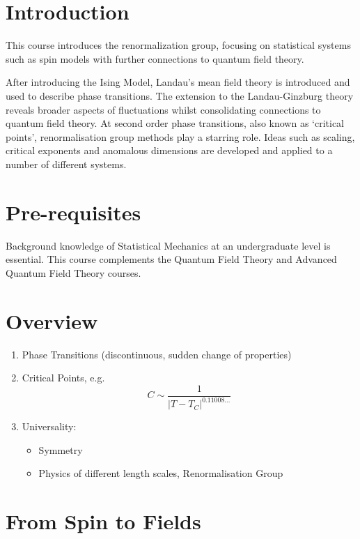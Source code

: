\documentclass[a4paper,11pt]{article}
\begin{document}
	\maketitlepage
	\preliminaries

	\section*{Introduction}
	
	This course introduces the renormalization group, focusing on statistical systems such as spin models with further connections to quantum field theory.

	\noindent After introducing the Ising Model, Landau’s mean field theory is introduced and used to describe phase transitions. The extension to the Landau-Ginzburg theory reveals broader aspects of fluctuations whilst consolidating connections to quantum field theory. At second order phase transitions, also known as ‘critical points’, renormalisation group methods play a starring role. Ideas such as scaling, critical exponents and anomalous dimensions are developed and applied to a number of different systems.

	\section*{Pre-requisites}

	Background knowledge of Statistical Mechanics at an undergraduate level is essential. This course complements the Quantum Field Theory and Advanced Quantum Field Theory courses.

	\newpage

	\section*{Overview}
	\begin{enumerate}
		\item Phase Transitions (discontinuous, sudden change of properties)
		\item Critical Points, e.g.\ \[
			C \sim \frac{1}{|T - T_C|^{0.11008\dots}}
		\]
		\item Universality:
		\begin{itemize}
			\item Symmetry
			\item Physics of different length scales, Renormalisation Group
		\end{itemize}
	\end{enumerate}


  
	\newpage
	\tableofcontents
	\newpage
	\maintext
	\section{From Spin to Fields}
\end{document}
